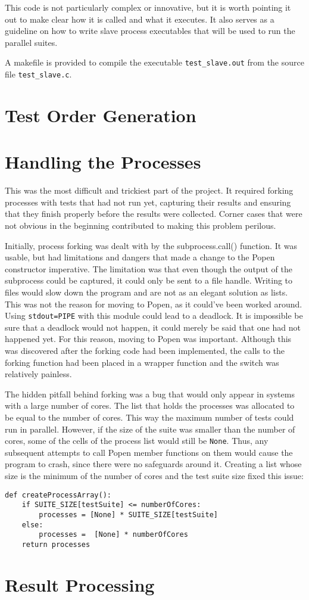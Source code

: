 This code is not particularly complex or innovative, but it is worth pointing it out to make clear how it is called and what it executes. It also serves as a guideline on how to write slave process executables that will be used to run the parallel suites.

A makefile is provided to compile the executable \texttt{test\_slave.out} from the source file \texttt{test\_slave.c}.

\section{Test Order Generation}

\section{Handling the Processes}
This was the most difficult and trickiest part of the project. It required forking processes with tests that had not run yet, capturing their results and ensuring that they finish properly before the results were collected. Corner cases that were not obvious in the beginning contributed to making this problem perilous. 

Initially, process forking was dealt with by the subprocess.call() function. It was usable, but had limitations and dangers that made a change to the Popen constructor imperative. The limitation was that even though the output of the subprocess could be captured, it could only be sent to a file handle. Writing to files would slow down the program and are not as an elegant solution as lists. This was not the reason for moving to Popen, as it could've been worked around. Using \texttt{stdout=PIPE} with this module could lead to a deadlock. It is impossible be sure that a deadlock would not happen, it could merely be said that one had not happened yet. For this reason, moving to Popen was important. Although this was discovered after the forking code had been implemented, the calls to the forking function had been placed in a wrapper function and the switch was relatively painless.

The hidden pitfall behind forking was a bug that would only appear in systems with a large number of cores. The list that holds the processes was allocated to be equal to the number of cores. This way the maximum number of tests could run in parallel. However, if the size of the suite was smaller than the number of cores, some of the cells of the process list would still be \texttt{None}. Thus, any subsequent attempts to call Popen member functions on them would cause the program to crash, since there were no safeguards around it. Creating a list whose size is the minimum of the number of cores and the test suite size fixed this issue:

\begin{verbatim}
def createProcessArray():
    if SUITE_SIZE[testSuite] <= numberOfCores:
        processes = [None] * SUITE_SIZE[testSuite]
    else:
        processes =  [None] * numberOfCores
    return processes
\end{verbatim}
\section{Result Processing}
